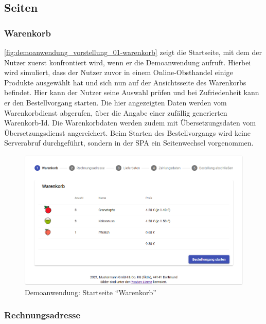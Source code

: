 \subsection{Seiten}

\subsubsection{Warenkorb}

\autoref{fig:demoanwendung_vorstellung_01-warenkorb} zeigt die Startseite, mit dem der Nutzer zuerst konfrontiert wird, wenn er die Demoanwendung aufruft. Hierbei wird simuliert, dass der Nutzer zuvor in einem Online-Obsthandel einige Produkte ausgewählt hat und sich nun auf der Ansichtsseite des Warenkorbs befindet. Hier kann der Nutzer seine Auswahl prüfen und bei Zufriedenheit kann er den Bestellvorgang starten. Die hier angezeigten Daten werden vom Warenkorbdienst abgerufen, über die Angabe einer zufällig generierten Warenkorb-Id. Die Warenkorbdaten werden zudem mit Übersetzungsdaten vom Übersetzungsdienst angereichert. Beim Starten des Bestellvorgangs wird keine Serverabruf durchgeführt, sondern in der SPA ein Seitenwechsel vorgenommen.

\begin{figure}[H]
	\centering
	\includegraphics[width=1.00\linewidth]{img/04_erstellung-poc/demoanwendung_vorstellung_01-warenkorb.png}
	\caption{Demoanwendung: Startseite \enquote{Warenkorb}}
	\label{fig:demoanwendung_vorstellung_01-warenkorb}
\end{figure}

\subsubsection{Rechnungsadresse}

